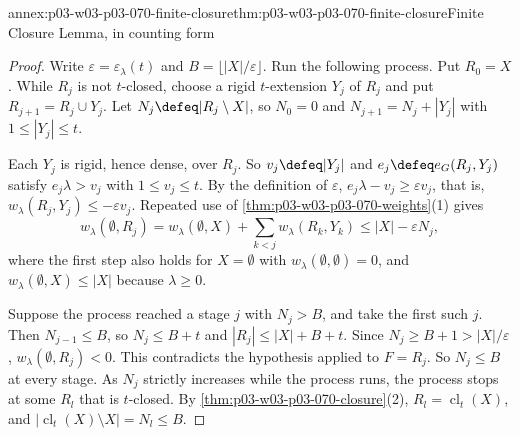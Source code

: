 \begin{annexitem}{annex:p03-w03-p03-070-finite-closure}{thm:p03-w03-p03-070-finite-closure}{Finite Closure Lemma, in counting form}
\begin{proof}
Write \(\varepsilon=\varepsilon_\lambda(t)\) and \(B=\lfloor|X|/\varepsilon\rfloor\).
Run the following process.  Put \(R_0=X\).  While \(R_j\) is not
\(t\)-closed, choose a rigid \(t\)-extension \(Y_j\) of \(R_j\) and put
\(R_{j+1}=R_j\cup Y_j\).  Let \(N_j\defeq|R_j\setminus X|\), so
\(N_0=0\) and \(N_{j+1}=N_j+|Y_j|\) with \(1\leq|Y_j|\leq t\).

Each \(Y_j\) is rigid, hence dense, over \(R_j\).  So
\(v_j\defeq|Y_j|\) and \(e_j\defeq e_G(R_j,Y_j)\) satisfy \(e_j\lambda>v_j\)
with \(1\leq v_j\leq t\).  By the definition of \(\varepsilon\),
\(e_j\lambda-v_j\geq\varepsilon v_j\), that is,
\(w_\lambda(R_j,Y_j)\leq-\varepsilon v_j\).  Repeated use of
\cref{thm:p03-w03-p03-070-weights}(1) gives
\[
 w_\lambda(\emptyset,R_j)=w_\lambda(\emptyset,X)+\sum_{k<j}w_\lambda(R_k,Y_k)
 \leq|X|-\varepsilon N_j ,
\]
where the first step also holds for \(X=\emptyset\) with
\(w_\lambda(\emptyset,\emptyset)=0\), and
\(w_\lambda(\emptyset,X)\leq|X|\) because \(\lambda\geq0\).

Suppose the process reached a stage \(j\) with \(N_j>B\), and take the first
such \(j\).  Then \(N_{j-1}\leq B\), so \(N_j\leq B+t\) and
\(|R_j|\leq|X|+B+t\).  Since \(N_j\geq B+1>|X|/\varepsilon\),
\(w_\lambda(\emptyset,R_j)<0\).  This contradicts the hypothesis applied to
\(F=R_j\).  So \(N_j\leq B\) at every stage.  As \(N_j\) strictly increases
while the process runs, the process stops at some \(R_l\) that is
\(t\)-closed.  By \cref{thm:p03-w03-p03-070-closure}(2),
\(R_l=\operatorname{cl}_t(X)\), and
\(|\operatorname{cl}_t(X)\setminus X|=N_l\leq B\).
\end{proof}
\end{annexitem}

